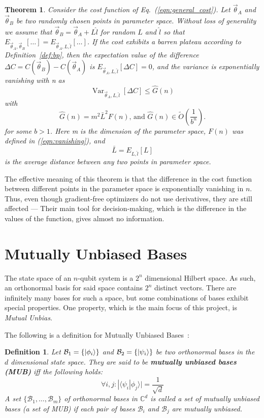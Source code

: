 \documentclass[a4paper,12pt]{article}
\newcommand{\thetas}{\vec{\theta}}
\newcommand{\base}{\mathcal{B}}
\DeclareMathOperator{\Var}{Var}
\newtheorem{definition}{Definition}
\newtheorem{theorem}{Theorem}
\begin{document}
\begin{theorem}
    Consider the cost function of Eq.~(\ref{eqn:general_cost}). Let ${\thetas}_A$ and $\thetas_B$ be two randomly chosen points in parameter space.
    Without loss of generality we assume that $\thetas_B = \thetas_A + L\hat{l}$ for random $L$ and $\hat{l}$ so that $E_{\thetas_A, \thetas_B}[\dots] = E_{\thetas_A, L, \hat{l}}[\dots]$.
    If the cost exhibits a barren plateau according to Definition~\ref{def:bp}, then the expectation value of the difference $\Delta C = C(\thetas_B) - C(\thetas_A)$ is $E_{\thetas_A, L, \hat{l}}[\Delta C] = 0$, and the variance is exponentially vanishing with n as 
    \begin{equation}
        \Var_{\thetas_A,L,\hat{l}}[\Delta C] \leq \hat{G}(n)
    \end{equation}
    with
    \begin{equation}
        \hat{G}(n) = m^2 \bar{L}^2 F(n)\textrm{,    and     } \hat{G}(n) \in \tilde{O}\left(\frac{1}{b^n}\right).
    \end{equation}
    for some $b>1$. Here m is the dimension of the parameter space, $F(n)$ was defined in (\ref{eqn:vanishing}), and
    \begin{equation}
        \bar{L} = E_{L,\hat{l}}[L]
    \end{equation}
    is the average distance between any two points in parameter space.
\end{theorem}

The effective meaning of this theorem is that the difference in the cost function between different points in the parameter space is exponentially vanishing in $n$.
Thus, even though gradient-free optimizers do not use derivatives, they are still affected --- Their main tool for decision-making, which is the difference in the values of the function, gives almost no information.

\section{Mutually Unbiased Bases}
The state space of an $n$-qubit system is a $2^n$ dimensional Hilbert space.
As such, an orthonormal basis for said space contains $2^n$ distinct vectors.
There are infinitely many bases for such a space, but some combinations of bases exhibit special properties. One property, which is the main focus of this project, is \emph{Mutual Unbias}.

The following is a definition for Mutually Unbiased Bases~\cite{bandyopadhyay_new_2002}:
\begin{definition}
    Let $\base_1 = \{\ket{\phi_i}\}$ and $\base_2 = \{\ket{\psi_i}\}$ be two orthonormal bases in the $d$ dimensional state space.
    They are said to be \textbf{mutually unbiased bases (MUB)} iff the following holds:
    \begin{equation}
        \forall i,j : |\langle \psi_i | \phi_j \rangle | = \frac{1}{\sqrt{d}}
    \end{equation}
    A set $\{\base_1,\dots,\base_m\}$ of orthonormal bases in $\mathbb{C}^d$ is called a \emph{set of mutually unbiased bases} (a set of MUB) if each pair of bases $\base_i$ and $\base_j$ are mutually unbiased.
\end{definition}
\end{document}
